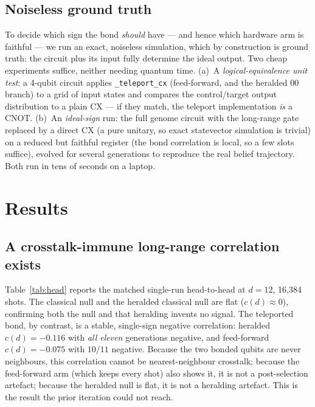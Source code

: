\documentclass[conference]{IEEEtran}
\begin{document}
\subsection{Noiseless ground truth}
\label{sec:ideal-method}

To decide which sign the bond \emph{should} have --- and hence which hardware arm is
faithful --- we run an exact, noiseless simulation, which by construction is ground truth:
the circuit plus its input fully determine the ideal output. Two cheap experiments suffice,
neither needing quantum time. (a)~A \emph{logical-equivalence unit test}: a 4-qubit circuit
applies \texttt{\_teleport\_cx} (feed-forward, and the heralded $00$ branch) to a grid of
input states and compares the control/target output distribution to a plain
$\mathrm{CX}$ --- if they match, the teleport implementation \emph{is} a CNOT. (b)~An
\emph{ideal-sign} run: the full genome circuit with the long-range gate replaced by a
direct $\mathrm{CX}$ (a pure unitary, so exact statevector simulation is trivial) on a
reduced but faithful register (the bond correlation is local, so a few slots suffice),
evolved for several generations to reproduce the real belief trajectory. Both run in tens
of seconds on a laptop.

\section{Results}
\label{sec:results}

\subsection{A crosstalk-immune long-range correlation exists}

Table~\ref{tab:head} reports the matched single-run head-to-head at $d{=}12$, 16{,}384
shots. The classical null and the heralded classical null are flat ($c(d){\approx}0$),
confirming both the null and that heralding invents no signal. The teleported bond, by
contrast, is a stable, single-sign negative correlation: heralded $c(d){=}-0.116$ with
\emph{all eleven} generations negative, and feed-forward $c(d){=}-0.075$ with $10/11$
negative. Because the two bonded qubits are never neighbours, this correlation cannot be
nearest-neighbour crosstalk; because the feed-forward arm (which keeps every shot) also
shows it, it is not a post-selection artefact; because the heralded null is flat, it is not
a heralding artefact. This is the result the prior iteration could not reach.
\end{document}
